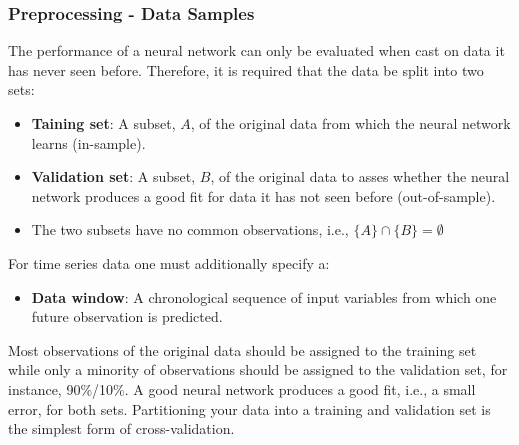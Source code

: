 \documentclass[xcolor=dvipsnames, english, 8pt]{beamer}
\begin{document}
\begin{frame}
    \frametitle{Preprocessing - Data Samples}
    The performance of a neural network can only be evaluated when cast on data it has never seen before. Therefore, it is required that the data be split into two sets:\vspace{0.25cm}\\
    \begin{itemize}
        \item {\textbf{\color{ubRed}Taining set}:} A subset, $A$, of the original data from which the neural network learns (in-sample).
        \item {\textbf{\color{ubRed}Validation set}:} A subset, $B$, of the original data to asses whether the neural network produces a good fit for data it has not seen before (out-of-sample).
        \item The two subsets have no common observations, i.e., $\{A\} \cap \{B\} = \emptyset$ \vspace{0.25cm}\\
    \end{itemize}
    For time series data one must additionally specify a:\vspace{0.25cm}\\
    \begin{itemize}
        \item {\textbf{\color{ubRed}Data window}:} A chronological sequence of input variables from which one future observation is predicted. \vspace{0.25cm}\\
    \end{itemize}
 Most observations of the original data should be assigned to the training set while only a minority of observations should be assigned to the validation set, for instance, 90\%/10\%. A good neural network produces a good fit, i.e., a small error, for both sets. Partitioning your data into a training and validation set is the simplest form of {\color{ubRed} cross-validation}.\\
\end{frame}
\end{document}
